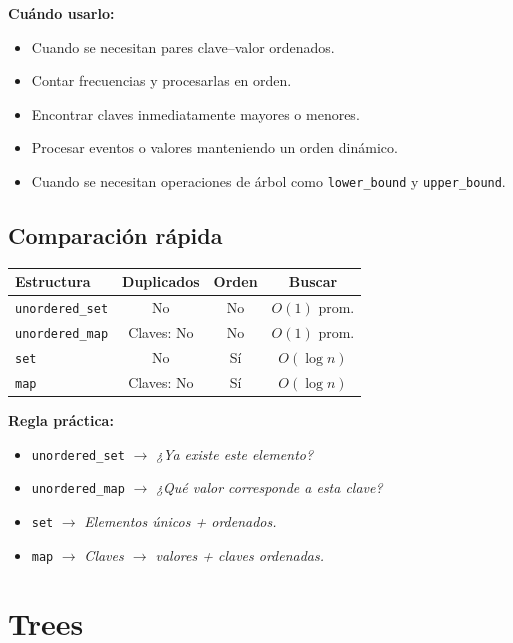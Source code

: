 \documentclass[10pt,a4paper,twocolumn]{article}
\begin{document}
\textbf{Cuándo usarlo:}
\begin{itemize}
    \item Cuando se necesitan pares clave--valor ordenados.
    \item Contar frecuencias y procesarlas en orden.
    \item Encontrar claves inmediatamente mayores o menores.
    \item Procesar eventos o valores manteniendo un orden dinámico.
    \item Cuando se necesitan operaciones de árbol como
    \texttt{lower\_bound} y \texttt{upper\_bound}.
\end{itemize}


\subsection*{Comparación rápida}

\begin{center}
\small
\begin{tabular}{|l|c|c|c|}
\hline
\textbf{Estructura} & \textbf{Duplicados} & \textbf{Orden} & \textbf{Buscar} \\
\hline
\texttt{unordered\_set} & No & No & $O(1)$ prom. \\
\hline
\texttt{unordered\_map} & Claves: No & No & $O(1)$ prom. \\
\hline
\texttt{set} & No & Sí & $O(\log n)$ \\
\hline
\texttt{map} & Claves: No & Sí & $O(\log n)$ \\
\hline
\end{tabular}
\end{center}

\textbf{Regla práctica:}

\begin{itemize}[nosep,leftmargin=*]
    \item \texttt{unordered\_set} $\rightarrow$ \textit{¿Ya existe este elemento?}
    \item \texttt{unordered\_map} $\rightarrow$ \textit{¿Qué valor corresponde a esta clave?}
    \item \texttt{set} $\rightarrow$ \textit{Elementos únicos + ordenados.}
    \item \texttt{map} $\rightarrow$ \textit{Claves $\rightarrow$ valores + claves ordenadas.}
\end{itemize}


\section{Trees}
\end{document}
